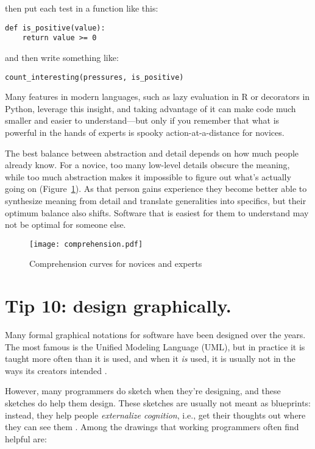 \documentclass[10pt,letterpaper]{article}
\begin{document}
\noindent
then put each test in a function like this:

\begin{lstlisting}
def is_positive(value):
    return value >= 0
\end{lstlisting}

\noindent
and then write something like:

\begin{lstlisting}
count_interesting(pressures, is_positive)
\end{lstlisting}

Many features in modern languages,
such as lazy evaluation in R or decorators in Python,
leverage this insight,
and taking advantage of it can make code much smaller
and easier to understand---but only if you remember that
what is powerful in the hands of experts is spooky action-at-a-distance for novices.

\begin{mdframed}
  The best balance between abstraction and detail
  depends on how much people already know.
  For a novice,
  too many low-level details obscure the meaning,
  while too much abstraction makes it impossible to figure out what's actually going on
  (Figure~\ref{comprehension}).
  As that person gains experience
  they become better able to synthesize meaning from detail
  and translate generalities into specifics,
  but their optimum balance also shifts.
  Software that is easiest for them to understand may not be optimal for someone else.
\end{mdframed}

\begin{figure}
  \centering
  \texttt{[image: comprehension.pdf]}
  \caption{Comprehension curves for novices and experts}
  \label{comprehension}
\end{figure}

\section*{Tip 10: design graphically.}

Many formal graphical notations for software have been designed over the years.
The most famous is the Unified Modeling Language (UML),
but in practice it is taught more often than it is used,
and when it \emph{is} used,
it is usually not in the ways its creators intended \cite{Petre2013}.

However,
many programmers do sketch when they're designing,
and these sketches do help them design.
These sketches are usually not meant as blueprints:
instead,
they help people \emph{externalize cognition},
i.e.,
get their thoughts out where they can see them \cite{Cherubini2007,Petre2016}.
Among the drawings that working programmers often find helpful are:
\end{document}
